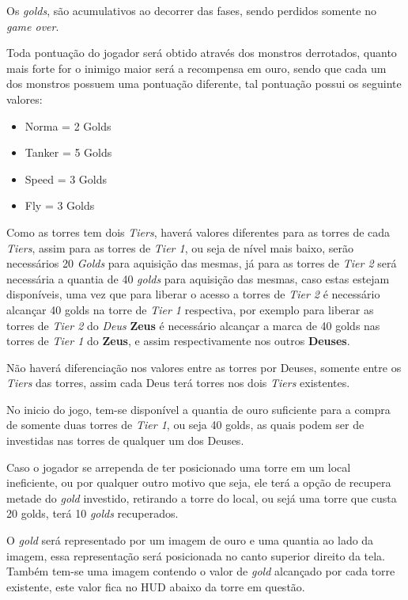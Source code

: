 \documentclass[11pt]{article} %
\begin{document}
Os \textit{golds}, são acumulativos ao decorrer das fases, sendo perdidos somente no \textit{game over}.

Toda pontuação do jogador será obtido através dos monstros derrotados, quanto mais forte for o inimigo  maior será a recompensa em ouro, sendo que cada um dos monstros possuem uma pontuação diferente, tal pontuação possui os seguinte valores:

\begin{itemize}
 \item Norma = 2 Golds
 \item Tanker = 5 Golds
 \item Speed = 3 Golds
 \item Fly = 3 Golds
 \end{itemize} 
 
Como as torres tem dois \textit{Tiers}, haverá valores diferentes para as torres de cada \textit{Tiers}, assim para as torres de \textit{Tier 1}, ou seja de nível mais baixo, serão necessários 20 \textit{Golds} para aquisição das mesmas, já para as torres de \textit{Tier 2} será necessária a quantia de 40 \textit{golds} para aquisição das mesmas, caso estas estejam disponíveis, uma vez que para liberar o acesso a torres de \textit{Tier 2} é necessário alcançar 40 golds na torre de \textit{Tier 1} respectiva, por exemplo para liberar as torres de \textit{Tier 2} do \textit{Deus} \textbf{Zeus} é necessário alcançar a marca de 40 golds nas torres de \textit{Tier 1} do \textbf{Zeus}, e assim respectivamente nos outros \textbf{Deuses}.

Não haverá diferenciação nos valores entre as torres por Deuses, somente entre os \textit{Tiers} das torres, assim cada Deus terá torres nos dois \textit{Tiers} existentes.
 
No inicio do jogo, tem-se disponível a quantia de ouro suficiente para a compra de somente duas torres de \textit{Tier 1}, ou seja 40 golds, as quais podem ser de investidas nas torres de qualquer um dos Deuses.  

Caso o jogador se arrependa de ter posicionado uma torre em um local ineficiente, ou por qualquer outro motivo que seja, ele terá a opção de recupera metade do \textit{gold} investido, retirando a torre do local, ou sejá uma torre que custa 20 golds, terá 10 \textit{golds} recuperados.
 
 
O \textit{gold} será representado por um imagem de ouro e uma quantia ao lado da imagem, essa representação será posicionada no canto superior direito da tela. Também tem-se uma imagem contendo o valor de \textit{gold} alcançado por cada torre existente, este valor fica no HUD abaixo da torre em questão.
\end{document}

